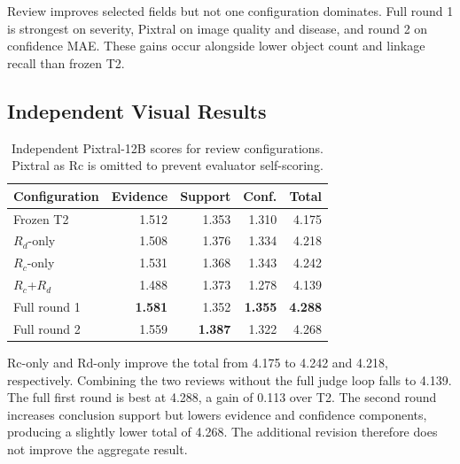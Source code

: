 \documentclass[11pt]{article}
\newcommand{\Ttwo}{\textsc{T2}}
\newcommand{\Rc}{\ensuremath{R_{c}}}
\newcommand{\Rd}{\ensuremath{R_{d}}}
\newcommand{\best}[1]{\textbf{#1}}
\begin{document}
Review improves selected fields but not one configuration dominates. Full
round 1 is strongest on severity, Pixtral on image quality and disease, and
round 2 on confidence MAE. These gains occur alongside lower object count and
linkage recall than frozen T2.

\subsection{Independent Visual Results}

\begin{table}[H]
\centering
\small
\setlength{\tabcolsep}{3.7pt}
\begin{tabular}{lrrrr}
\toprule
Configuration & Evidence & Support & Conf. & Total \\
\midrule
Frozen \Ttwo & 1.512 & 1.353 & 1.310 & 4.175 \\
\Rd-only & 1.508 & 1.376 & 1.334 & 4.218 \\
\Rc-only & 1.531 & 1.368 & 1.343 & 4.242 \\
\Rc+\Rd & 1.488 & 1.373 & 1.278 & 4.139 \\
Full round 1 & \best{1.581} & 1.352 & \best{1.355} & \best{4.288} \\
Full round 2 & 1.559 & \best{1.387} & 1.322 & 4.268 \\
\bottomrule
\end{tabular}
\caption{Independent Pixtral-12B scores for review configurations. Pixtral as
Rc is omitted to prevent evaluator self-scoring.}
\label{tab:review-visual}
\end{table}

Rc-only and Rd-only improve the total from 4.175 to 4.242 and 4.218,
respectively. Combining the two reviews without the full judge loop falls to
4.139. The full first round is best at 4.288, a gain of 0.113 over T2. The
second round increases conclusion support but lowers evidence and confidence
components, producing a slightly lower total of 4.268. The additional revision
therefore does not improve the aggregate result.
\end{document}
